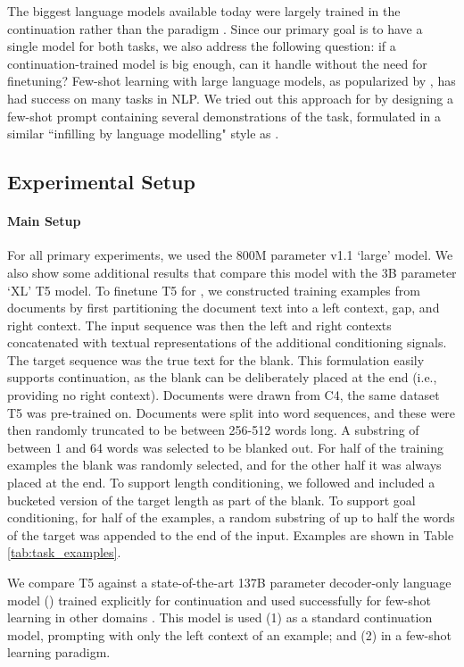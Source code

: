 The biggest language models available today were largely trained in the continuation rather than the \FitB{} paradigm \citep{gpt3,gpt-neo}.
Since our primary goal is to have a single model for both tasks, we also address the following question: if a continuation-trained model is big enough, can it handle \FitB{} without the need for finetuning?
Few-shot learning with large language models, as popularized by \citet{gpt3}, has had success on many tasks in NLP.
We tried out this approach for \FitB{} by designing a few-shot prompt containing several demonstrations of the \FitB{} task, formulated in a similar ``infilling by language modelling" style as \citet{donahue2020enabling}.

\subsection{Experimental Setup}
\paragraph{Main Setup}
For all primary experiments, we used the 800M parameter v1.1 `large' model.
We also show some additional results that compare this model with the 3B parameter `XL' T5 model.
To finetune T5 for \FitB, we constructed training examples from documents by first partitioning the document text into a left context, gap, and right context.
The input sequence was then the left and right contexts concatenated with textual representations of the additional conditioning signals.
The target sequence was the true text for the blank.
This formulation easily supports continuation, as the blank can be deliberately placed at the end (i.e., providing no right context).
Documents were drawn from C4, the same dataset T5 was pre-trained on.
Documents were split into word sequences, and these were then randomly truncated to be between 256-512 words long.
A substring of between 1 and 64 words was selected to be blanked out.
For half of the training examples the blank was randomly selected, and for the other half it was always placed at the end.
To support length conditioning, we followed \citet{roberts2020exploring} and included a bucketed version of the target length as part of the blank.
To support goal conditioning, for half of the examples, a random substring of up to half the words of the target was appended to the end of the input.
Examples are shown in Table \ref{tab:task_examples}.

We compare T5 against a state-of-the-art 137B parameter decoder-only language model (\LLM{}) trained explicitly for continuation and used successfully for few-shot learning in other domains \citep{austin2021program,reif2021recipe}.
This model is used (1) as a standard continuation model, prompting with only the left context of an example; and (2) in a few-shot learning paradigm.

